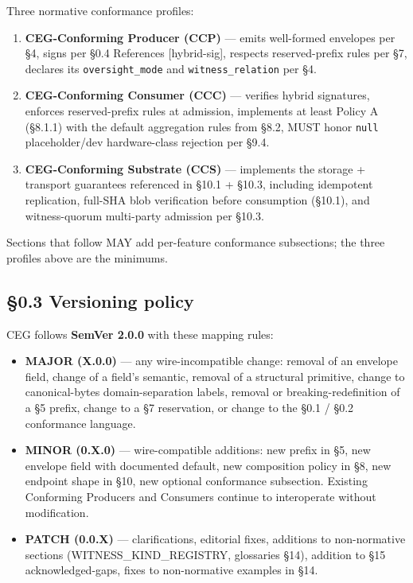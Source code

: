 \documentclass[11pt]{article}
\begin{document}
Three normative conformance profiles:


\begin{enumerate}\setlength\itemsep{0pt}
\item \textbf{CEG-Conforming Producer (CCP)} — emits well-formed envelopes per §4, signs per §0.4 References [hybrid-sig], respects reserved-prefix rules per §7, declares its \texttt{oversight\_mode} and \texttt{witness\_relation} per §4.
\item \textbf{CEG-Conforming Consumer (CCC)} — verifies hybrid signatures, enforces reserved-prefix rules at admission, implements at least Policy A (§8.1.1) with the default aggregation rules from §8.2, MUST honor \texttt{null} placeholder/dev hardware-class rejection per §9.4.
\item \textbf{CEG-Conforming Substrate (CCS)} — implements the storage + transport guarantees referenced in §10.1 + §10.3, including idempotent replication, full-SHA blob verification before consumption (§10.1), and witness-quorum multi-party admission per §10.3.
\end{enumerate}


Sections that follow MAY add per-feature conformance subsections; the three profiles above are the minimums.



\subsection*{§0.3 Versioning policy}


CEG follows \textbf{SemVer 2.0.0} with these mapping rules:


\begin{itemize}\setlength\itemsep{0pt}
\item \textbf{MAJOR (X.0.0)} — any wire-incompatible change: removal of an envelope field, change of a field's semantic, removal of a structural primitive, change to canonical-bytes domain-separation labels, removal or breaking-redefinition of a §5 prefix, change to a §7 reservation, or change to the §0.1 / §0.2 conformance language.
\item \textbf{MINOR (0.X.0)} — wire-compatible additions: new prefix in §5, new envelope field with documented default, new composition policy in §8, new endpoint shape in §10, new optional conformance subsection. Existing Conforming Producers and Consumers continue to interoperate without modification.
\item \textbf{PATCH (0.0.X)} — clarifications, editorial fixes, additions to non-normative sections (WITNESS\_KIND\_REGISTRY, glossaries §14), addition to §15 acknowledged-gaps, fixes to non-normative examples in §14.
\end{itemize}
\end{document}
